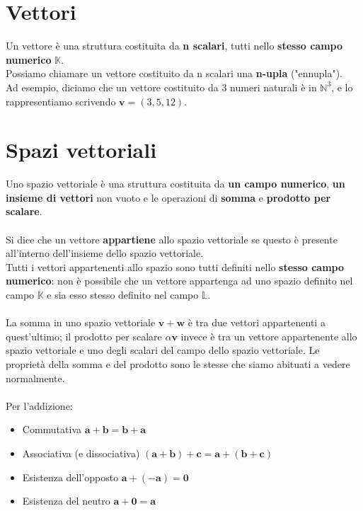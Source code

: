 \documentclass{article}
\begin{document}
\section{Vettori}
Un vettore è una struttura costituita da \textbf{n scalari}, tutti nello \textbf{stesso campo numerico} \(\mathbb{K}\).\\
Possiamo chiamare un vettore costituito da n scalari una \textbf{n-upla} ("ennupla").\\
Ad esempio, diciamo che un vettore costituito da 3 numeri naturali è in \(\mathbb{N}^3\), e lo rappresentiamo scrivendo \(\mathbf{v} = (3, 5, 12)\).\\

\section{Spazi vettoriali}
Uno spazio vettoriale è una struttura costituita da \textbf{un campo numerico}, \textbf{un insieme di vettori} non vuoto e le operazioni di \textbf{somma} e \textbf{prodotto per scalare}.\\
\\
Si dice che un vettore \textbf{appartiene} allo spazio vettoriale se questo è presente all'interno dell'insieme dello spazio vettoriale.\\
Tutti i vettori appartenenti allo spazio sono tutti definiti nello \textbf{stesso campo numerico}: non è possibile che un vettore appartenga ad uno spazio definito nel campo \(\mathbb{K}\) e sia esso stesso definito nel campo \(\mathbb{L}\).\\
\\
La somma in uno spazio vettoriale \(\mathbf{v} + \mathbf{w}\) è tra due vettori appartenenti a quest'ultimo; il prodotto per scalare \(\alpha \mathbf{v}\) invece è tra un vettore appartenente allo spazio vettoriale e uno degli scalari del campo dello spazio vettoriale.
Le proprietà della somma e del prodotto sono le stesse che siamo abituati a vedere normalmente.\\\\
Per l'addizione:
\begin{itemize}
    \item Commutativa \(\mathbf{a} + \mathbf{b} = \mathbf{b} + \mathbf{a}\)
    \item Associativa (e dissociativa) \((\mathbf{a} + \mathbf{b}) + \mathbf{c} = \mathbf{a} + (\mathbf{b} + \mathbf{c})\)
    \item Esistenza dell'opposto \(\mathbf{a} + (-\mathbf{a}) = \mathbf{0}\)
    \item Esistenza del neutro \(\mathbf{a} + \mathbf{0} = \mathbf{a}\)
\end{itemize}
\end{document}
